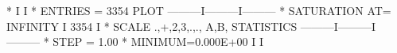 \begin{Listing}
  *                                                          I         I
  * ENTRIES =     3354                   PLOT       ---------I---------I---------
  * SATURATION  AT=     INFINITY                             I 3354    I
  * SCALE  .,+,2,3,.,., A,B,           STATISTICS   ---------I---------I---------
  * STEP = 1.00     * MINIMUM=0.000E+00                      I         I
\end{Listing}

